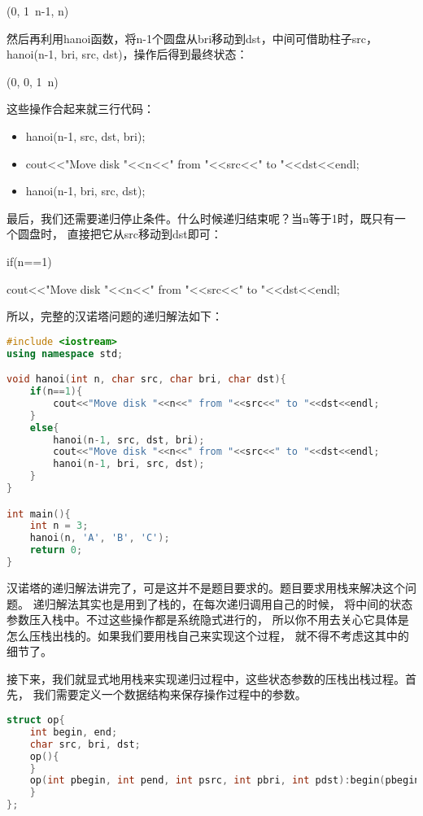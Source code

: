 \begin{description}
(0, 1~n-1, n)

然后再利用hanoi函数，将n-1个圆盘从bri移动到dst，中间可借助柱子src， hanoi(n-1, bri, src, dst)，操作后得到最终状态：

(0, 0, 1~n)

这些操作合起来就三行代码：
\begin{itemize}
\item hanoi(n-1, src, dst, bri);
\item cout<<"Move disk "<<n<<" from "<<src<<" to "<<dst<<endl;
\item hanoi(n-1, bri, src, dst);
\end{itemize}

最后，我们还需要递归停止条件。什么时候递归结束呢？当n等于1时，既只有一个圆盘时， 直接把它从src移动到dst即可：

if(n==1){

    cout<<"Move disk "<<n<<" from "<<src<<" to "<<dst<<endl;

}

所以，完整的汉诺塔问题的递归解法如下：

\begin{lstlisting}[language=C++]
#include <iostream>
using namespace std;

void hanoi(int n, char src, char bri, char dst){
    if(n==1){
        cout<<"Move disk "<<n<<" from "<<src<<" to "<<dst<<endl;
    }
    else{
        hanoi(n-1, src, dst, bri);
        cout<<"Move disk "<<n<<" from "<<src<<" to "<<dst<<endl;
        hanoi(n-1, bri, src, dst);
    }
}

int main(){
    int n = 3;
    hanoi(n, 'A', 'B', 'C');
    return 0;
}
\end{lstlisting}

汉诺塔的递归解法讲完了，可是这并不是题目要求的。题目要求用栈来解决这个问题。 递归解法其实也是用到了栈的，在每次递归调用自己的时候， 将中间的状态参数压入栈中。不过这些操作都是系统隐式进行的， 所以你不用去关心它具体是怎么压栈出栈的。如果我们要用栈自己来实现这个过程， 就不得不考虑这其中的细节了。

接下来，我们就显式地用栈来实现递归过程中，这些状态参数的压栈出栈过程。首先， 我们需要定义一个数据结构来保存操作过程中的参数。

\begin{lstlisting}[language=C++]
struct op{
    int begin, end;
    char src, bri, dst;
    op(){
    }
    op(int pbegin, int pend, int psrc, int pbri, int pdst):begin(pbegin), end(pend), src(psrc), bri(pbri), dst(pdst){
    }
};
\end{lstlisting}


\end{description}
